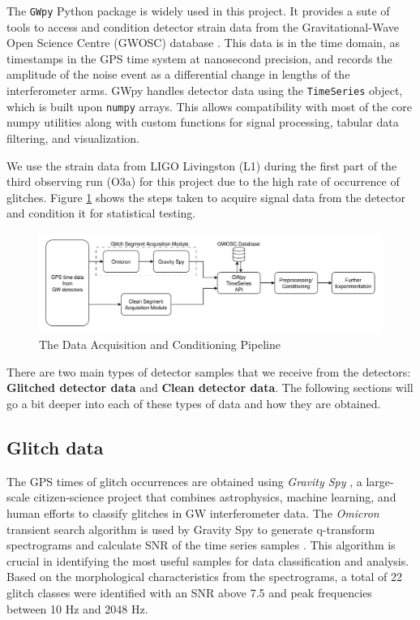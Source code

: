 \documentclass[12pt]{article}
\begin{document}
\noindent The \texttt{GWpy} Python package is widely used in this project. It provides a sute of tools to access and condition detector strain data from the Gravitational-Wave Open Science Centre (GWOSC) database \cite{gwpy}. This data is in the time domain, as timestamps in the GPS time system at nanosecond precision, and records the amplitude of the noise event as a differential change in lengths of the interferometer arms. GWpy handles detector data using the \texttt{TimeSeries} object, which is built upon \texttt{numpy} arrays. This allows compatibility with most of the core numpy utilities along with custom functions for signal processing, tabular data filtering, and visualization.

\medskip
\noindent We use the strain data from LIGO Livingston (L1) during the first part of the third observing run (O3a) for this project due to the high rate of occurrence of glitches. Figure \ref{fig:data_acq_cond} shows the steps taken to acquire signal data from the detector and condition it for statistical testing.

\begin{figure}[H]
    \centering
    \includegraphics[width=\textwidth]{images/data_acquisition_preparation.pdf}
    \caption{The Data Acquisition and Conditioning Pipeline}
    \label{fig:data_acq_cond}
\end{figure}

\medskip
\noindent There are two main types of detector samples that we receive from the detectors: \textbf{Glitched detector data} and \textbf{Clean detector data}. The following sections will go a bit deeper into each of these types of data and how they are obtained.
  
\subsection{Glitch data}\label{Glitchdata}

\medskip
\noindent The GPS times of glitch occurrences are obtained using \textit{Gravity Spy} \cite{Zevin_2017}, a large-scale citizen-science project that combines astrophysics, machine learning, and human efforts to classify glitches in GW interferometer data. The \textit{Omicron} transient search algorithm is used by Gravity Spy to generate q-transform spectrograms and calculate SNR of the time series samples \cite{robinet_omicron_2020}. This algorithm is crucial in identifying the most useful samples for data classification and analysis. Based on the morphological characteristics from the spectrograms, a total of 22 glitch classes were identified with an SNR above 7.5 and peak frequencies between 10 Hz and 2048 Hz.
\end{document}
